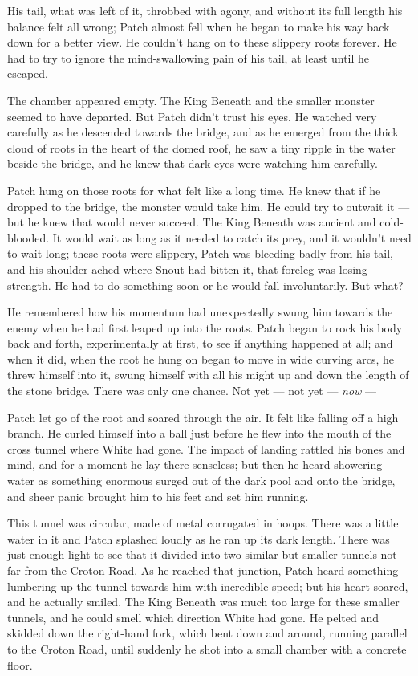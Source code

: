 \documentclass[12pt]{book}
\begin{document}
His tail, what was left of it, throbbed with agony, and without its full length his balance felt all wrong; Patch almost fell when he began to make his way back down for a better view. He couldn't hang on to these slippery roots forever. He had to try to ignore the mind-swallowing pain of his tail, at least until he escaped.

The chamber appeared empty. The King Beneath and the smaller monster seemed to have departed. But Patch didn't trust his eyes. He watched very carefully as he descended towards the bridge, and as he emerged from the thick cloud of roots in the heart of the domed roof, he saw a tiny ripple in the water beside the bridge, and he knew that dark eyes were watching him carefully.

Patch hung on those roots for what felt like a long time. He knew that if he dropped to the bridge, the monster would take him. He could try to outwait it ---
but he knew that would never succeed. The King Beneath was ancient and cold-blooded. It would wait as long as it needed to catch its prey, and it wouldn't need to wait long; these roots were slippery, Patch was bleeding badly from his tail, and his shoulder ached where Snout had bitten it, that foreleg was losing strength. He had to do something soon or he would fall involuntarily. But what?

He remembered how his momentum had unexpectedly swung him towards the enemy when he had first leaped up into the roots. Patch began to rock his body back and forth, experimentally at first, to see if anything happened at all; and when it did, when the root he hung on began to move in wide curving arcs, he threw himself into it, swung himself with all his might up and down the length of the stone bridge. There was only one chance. Not yet ---
not yet ---
{\it now} ---

Patch let go of the root and soared through the air. It felt like falling off a high branch. He curled himself into a ball just before he flew into the mouth of the cross tunnel where White had gone. The impact of landing rattled his bones and mind, and for a moment he lay there senseless; but then he heard showering water as something enormous surged out of the dark pool and onto the bridge, and sheer panic brought him to his feet and set him running.

This tunnel was circular, made of metal corrugated in hoops. There was a little water in it and Patch splashed loudly as he ran up its dark length. There was just enough light to see that it divided into two similar but smaller tunnels not far from the Croton Road. As he reached that junction, Patch heard something lumbering up the tunnel towards him with incredible speed; but his heart soared, and he actually smiled. The King Beneath was much too large for these smaller tunnels, and he could smell which direction White had gone. He pelted and skidded down the right-hand fork, which bent down and around, running parallel to the Croton Road, until suddenly he shot into a small chamber with a concrete floor.
\end{document}
